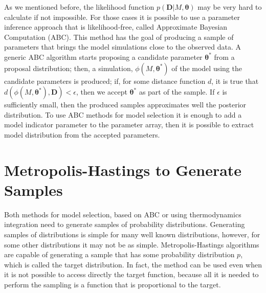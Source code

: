 As we mentioned before, the likelihood function 
$p({\bm D} | M, {\bm \theta})$ may be very hard to calculate if not 
impossible. For those cases it is possible to use a parameter inference
approach that is likelihood-free, called Approximate Bayesian 
Computation (ABC). This method has the goal of producing a sample of 
parameters that brings the model simulations close to the observed data.
A generic ABC algorithm starts proposing a candidate parameter 
${\bm \theta}^*$ from a proposal distribution; then, a simulation, 
$\phi (M, {\bm \theta}^*)$ of the model using the candidate parameters
is produced; if, for some distance function $d$, it is true that 
$d(\phi(M, {\bm \theta}^*), {\bm D}) < \epsilon$, then we accept 
${\bm \theta}^*$ as part of the sample. If $\epsilon$ is sufficiently 
small, then the produced samples approximates well the posterior 
distribution. To use ABC methods for model selection it is enough to add
a model indicator parameter to the parameter array, then it is possible
to extract model distribution from the accepted parameters.

\section{Metropolis-Hastings to Generate Samples}
Both methods for model selection, based on ABC or using thermodynamics
integration need to generate samples of probability distributions. 
Generating samples of distributions is simple for many well known 
distributions, however, for some other distributions it may not be as
simple. Metropolis-Hastings algorithms are capable of generating a 
sample that has some probability distribution $p$, which is called the 
target distribution. In fact, the method can be used even when it is not
possible to access directly the target function, because all it is 
needed to perform the sampling is a function that is proportional to the
target.

